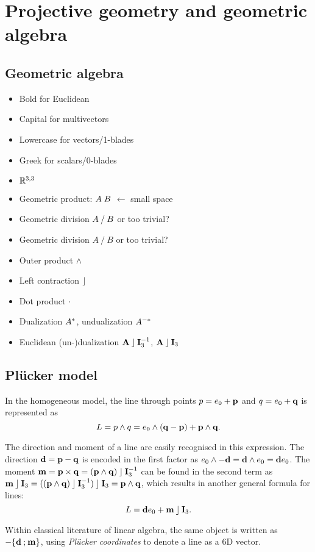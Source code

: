 \section{Projective geometry and geometric algebra}
\label{ch:background}

\subsection{Geometric algebra}
\label{sec:intro-ga}

\begin{itemize}
  \item Bold for Euclidean
  \item Capital for multivectors
  \item Lowercase for vectors/1-blades
  \item Greek for scalars/0-blades
  \item $\mathbb{R}^{3,3}$
  \item Geometric product: $A \; B$ $\leftarrow$ small space
  \item Geometric division $A \mathbin{/} B$ or too trivial?
  \item Geometric division $A \mathbin{/} B$ or too trivial?
  \item Outer product $\wedge$
  \item Left contraction $\mathbin{\rfloor}$
  \item Dot product $\mathbin{\cdot}$
  \item Dualization $A^\ast$, undualization $A^{-\ast}$
  \item Euclidean (un-)dualization $\mathbf{A} \mathbin{\rfloor} \mathbf{I}_3^{-1}$, $\mathbf{A} \mathbin{\rfloor} \mathbf{I}_3$
\end{itemize}

\subsection{Pl\"ucker model}
\label{sec:hongbo}

In the homogeneous model, the line through points $p = e_0 + \mathbf{p}$ and $q = e_0 + \mathbf{q}$ is represented as 
\begin{equation}
  L = p \wedge q = e_0 \wedge (\mathbf{q} - \mathbf{p}) + \mathbf{p} \wedge \mathbf{q} .
\end{equation}

The direction and moment of a line are easily recognised in this expression.  The direction $\mathbf{d} = \mathbf{p} - \mathbf{q}$ is encoded in the first factor as $e_0 \wedge -\mathbf{d} = \mathbf{d} \wedge e_0 = \mathbf{d} e_0$.  
The moment $\mathbf{m} = \mathbf{p} \times \mathbf{q} = (\mathbf{p} \wedge \mathbf{q}) \mathbin{\rfloor} \mathbf{I}_3^{-1}$ can be found in the second term as $\mathbf{m} \mathbin{\rfloor} \mathbf{I}_3 = ((\mathbf{p} \wedge \mathbf{q}) \mathbin{\rfloor} \mathbf{I}_3^{-1}) \mathbin{\rfloor} \mathbf{I}_3 = \mathbf{p} \wedge \mathbf{q}$, which results in another general formula for lines:
\begin{equation}
  L = \mathbf{d} e_0 + \mathbf{m} \mathbin{\rfloor} \mathbf{I}_3.
\end{equation}

Within classical literature of linear algebra, the same object is written as $-\{\mathbf{d} \mathbin{;} \mathbf{m}\}$, using \emph{Pl\"ucker coordinates} to denote a line as a 6D vector.  
